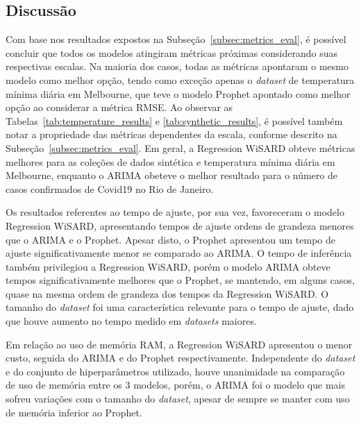 \FloatBarrier

\subsection{Discussão}
Com base nos resultados expostos na Subseção~\ref{subsec:metrics_eval}, é possível concluir que todos os modelos atingiram métricas próximas considerando suas respectivas escalas. Na maioria dos casos, todas as métricas apontaram o mesmo modelo como melhor opção, tendo como exceção apenas o \textit{dataset} de temperatura mínima diária em Melbourne, que teve o modelo Prophet apontado como melhor opção ao considerar a métrica RMSE. Ao observar as Tabelas~\ref{tab:temperature_results} e \ref{tab:synthetic_results}, é possível também notar a propriedade das métricas dependentes da escala, conforme descrito na Subseção~\ref{subsec:metrics_eval}. Em geral, a Regression WiSARD obteve métricas melhores para as coleções de dados sintética e temperatura mínima diária em Melbourne, enquanto o ARIMA obeteve o melhor resultado para o número de casos confirmados de Covid19 no Rio de Janeiro.

Os resultados referentes ao tempo de ajuste, por sua vez, favoreceram o modelo Regression WiSARD, apresentando tempos de ajuste ordens de grandeza menores que o ARIMA e o Prophet. Apesar disto, o Prophet apresentou um tempo de ajuste significativamente menor se comparado ao ARIMA. O tempo de inferência também privilegiou a Regression WiSARD, porém o modelo ARIMA obteve tempos significativamente melhores que o Prophet, se mantendo, em alguns casos, quase na mesma ordem de grandeza dos tempos da Regression WiSARD. O tamanho do \textit{dataset} foi uma característica relevante para o tempo de ajuste, dado que houve aumento no tempo medido em \textit{datasets} maiores.

Em relação ao uso de memória RAM, a Regression WiSARD apresentou o menor custo, seguida do ARIMA e do Prophet respectivamente. Independente do \textit{dataset} e do conjunto de hiperparâmetros utilizado, houve unanimidade na comparação de uso de memória entre os 3 modelos, porém, o ARIMA foi o modelo que mais sofreu variações com o tamanho do \textit{dataset}, apesar de sempre se manter com uso de memória inferior ao Prophet.